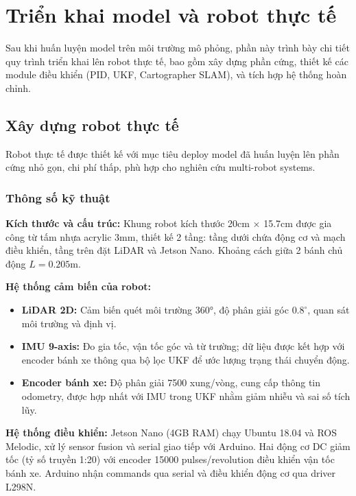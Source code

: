 \section{Triển khai model và robot thực tế}
\label{sec:deployment}

Sau khi huấn luyện model trên môi trường mô phỏng, phần này trình bày chi tiết quy trình triển khai lên robot thực tế, bao gồm xây dựng phần cứng, thiết kế các module điều khiển (PID, UKF, Cartographer SLAM), và tích hợp hệ thống hoàn chỉnh.

\subsection{Xây dựng robot thực tế}
\label{sec:hardware_design}

Robot thực tế được thiết kế với mục tiêu deploy model đã huấn luyện lên phần cứng nhỏ gọn, chi phí thấp, phù hợp cho nghiên cứu multi-robot systems.

\subsubsection{Thông số kỹ thuật}

\textbf{Kích thước và cấu trúc:} Khung robot kích thước 20cm × 15.7cm được gia công từ tấm nhựa acrylic 3mm, thiết kế 2 tầng: tầng dưới chứa động cơ và mạch điều khiển, tầng trên đặt LiDAR và Jetson Nano. Khoảng cách giữa 2 bánh chủ động $L = 0.205$m.

\textbf{Hệ thống cảm biến của robot:}
\begin{itemize}
    \item \textbf{LiDAR 2D:} Cảm biến quét môi trường 360°, độ phân giải góc $0.8^\circ$, quan sát môi trường và định vị.
    \item \textbf{IMU 9-axis:} Đo gia tốc, vận tốc góc và từ trường; dữ liệu được kết hợp với encoder bánh xe thông qua bộ lọc UKF để ước lượng trạng thái chuyển động.
    \item \textbf{Encoder bánh xe:} Độ phân giải 7500 xung/vòng, cung cấp thông tin odometry, được hợp nhất với IMU trong UKF nhằm giảm nhiễu và sai số tích lũy.
\end{itemize}
\textbf{Hệ thống điều khiển:} Jetson Nano (4GB RAM) chạy Ubuntu 18.04 và ROS Melodic, xử lý sensor fusion và serial giao tiếp với Arduino. Hai động cơ DC giảm tốc (tỷ số truyền 1:20) với encoder 15000 pulses/revolution điều khiển vận tốc bánh xe. Arduino nhận commands qua serial và điều khiển động cơ qua driver L298N.

